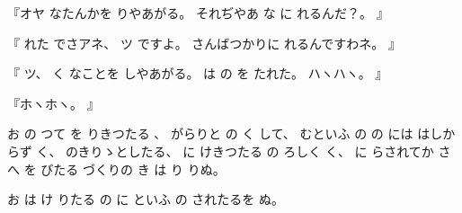 %
『オヤ
なたんかを
りやあがる。
%
それぢやあ
な
に
れるんだ？。
』

%
『
れた
でさアネ、
%
ツ
ですよ。
%
さんばつかりに
れるんですわネ。
』

%
『
ツ、
%
く
なことを
しやあがる。
%
は
の
を
たれた。
%
ハヽハヽ。
』

%
『ホヽホヽ。
』

%
お
の
つて
を
りきつたる
、
%
がらりと
の
く
して、
%
むといふ
の
の
には
はしからず
く、
%
のきりゝとしたる、
%
に
けきつたる
の
ろしく
く、
%
に
らされてか
さへ
を
びたる
づくりの
き
は
り
りぬ。

%
お
は
け
りたる
の
に
といふ
の
されたるを
ぬ。
